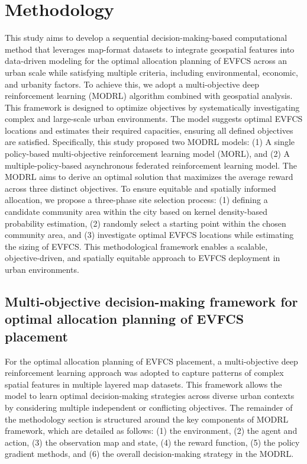 \documentclass[preprint,12pt]{elsarticle}
\begin{document}
\section{Methodology}
This study aims to develop a sequential decision-making-based computational method that leverages map-format datasets to integrate geospatial features into data-driven modeling for the optimal allocation planning of EVFCS across an urban scale while satisfying multiple criteria, including environmental, economic, and urbanity factors. To achieve this, we adopt a multi-objective deep reinforcement learning (MODRL) algorithm combined with geospatial analysis. This framework is designed to optimize objectives by systematically investigating complex and large-scale urban environments. The model suggests optimal EVFCS locations and estimates their required capacities, ensuring all defined objectives are satisfied. Specifically, this study proposed two MODRL models: (1) A single policy-based multi-objective reinforcement learning model (MORL), and (2) A multiple-policy-based asynchronous federated reinforcement learning model. The MODRL aims to derive an optimal solution that maximizes the average reward across three distinct objectives. To ensure equitable and spatially informed allocation, we propose a three-phase site selection process: (1) defining a candidate community area within the city based on kernel density-based probability estimation, (2) randomly select a starting point within the chosen community area, and (3) investigate optimal EVFCS locations while estimating the sizing of EVFCS. This methodological framework enables a scalable, objective-driven, and spatially equitable approach to EVFCS deployment in urban environments.  

\vspace{0.5cm}

\subsection{Multi-objective decision-making framework for optimal allocation planning of EVFCS placement}
For the optimal allocation planning of EVFCS placement, a multi-objective deep reinforcement learning approach was adopted to capture patterns of complex spatial features in multiple layered map datasets. This framework allows the model to learn optimal decision-making strategies across diverse urban contexts by considering multiple independent or conflicting objectives. The remainder of the methodology section is structured around the key components of MODRL framework, which are detailed as follows: (1) the environment, (2) the agent and action, (3) the observation map and state, (4) the reward function, (5) the policy gradient methods, and (6) the overall decision-making strategy in the MODRL. 
\end{document}

